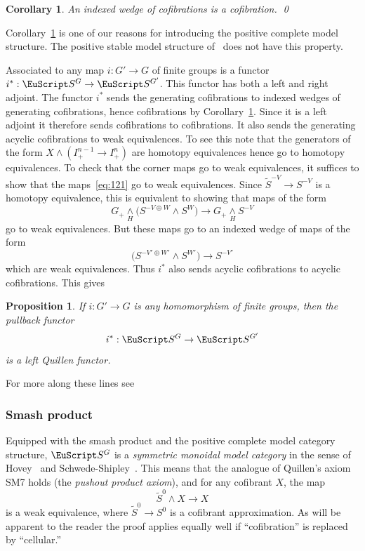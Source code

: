 \documentclass{amsart}
\newtheorem{cor}[equation]{Corollary}
\newtheorem{prop}[equation]{Proposition}
\theoremstyle{definition}
\theoremstyle{remark}
\newcommand{\spectra}{\EuScript S}
\newcommand{\ugspectra}[1]{\spectra^{#1}}
\begin{document}
\begin{cor}
\label{thm:168}
An indexed wedge of cofibrations is a cofibration. \qed
\end{cor}

Corollary~\ref{thm:168} is one of our reasons for introducing the
positive complete model structure.  The positive stable model
structure of~\cite{MR1922205} does not have this property.

Associated to any map $i:G'\to G$ of finite groups is a functor
$i^{\ast}:\ugspectra{G}\to \ugspectra{G'}$.  This functor has both a
left and right adjoint.  The functor $i^{\ast}$ sends the generating
cofibrations to indexed wedges of generating cofibrations, hence
cofibrations by Corollary~\ref{thm:168}.  Since it is a left adjoint
it therefore sends cofibrations to cofibrations.  It also sends the
generating acyclic cofibrations to weak equivalences.  To see this
note that the generators of the form $X\wedge (I^{n-1}_{+}\to
I^{n}_{+})$ are homotopy equivalences hence go to homotopy
equivalences.  To check that the corner maps go to weak equivalences,
it suffices to show that the maps~\eqref{eq:121} go to weak
equivalences.  Since $\tilde S^{-V} \to S^{-V}$ is a homotopy
equivalence, this is equivalent to showing that maps of the form
\[
G_{+}\underset{H}{\wedge}\big(S^{-V\oplus W}\wedge S^{W}\big)\to G_{+}\underset{H}{\wedge} S^{-V}
\]
go to weak equivalences.   But these maps go to an indexed wedge of
maps of the form 
\begin{equation}
\big(S^{-V'\oplus W'}\wedge S^{W'}\big)\to S^{-V'}
\end{equation}
which are weak equivalences.  Thus $i^{\ast}$ also sends acyclic
cofibrations to acyclic cofibrations.  This gives


\begin{prop}
\label{thm:241}
If $i:G'\to G$ is any homomorphism of finite groups, then the pullback functor 
\[
i^{\ast}:\ugspectra{G}\to \ugspectra{G'}
\]
is a left Quillen functor.
\end{prop}

For more along these lines see~\cite[Remark~V.3.13]{MR1922205}

\subsubsection{Smash product}
\label{sec:furth-homot-prop}
Equipped with the smash product and the positive complete model
category structure, $\ugspectra{G}$ is a {\em symmetric monoidal model
category} in the sense of Hovey~\cite[Definition
4.2.6]{hovey99:_model} and Schwede-Shipley~\cite{MR1997322}.  This
means that the analogue of Quillen's axiom SM7 holds (the {\em pushout
product axiom}), and for any cofibrant $X$, the map
\[
\tilde S^{0}\wedge X \to X
\]
is a weak equivalence, where $\tilde S^{0}\to S^{0}$ is a cofibrant
approximation.  As will be apparent to the reader the proof applies
equally well if ``cofibration'' is replaced by ``cellular.''
\end{document}
